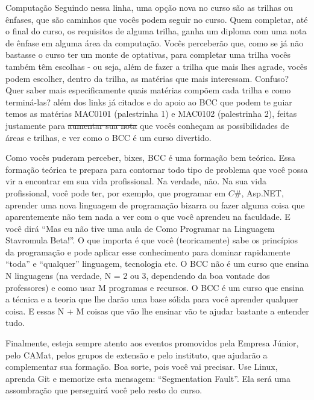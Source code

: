\begin{subsecao}{Computação}
Seguindo nessa linha, uma opção nova no curso são as trilhas ou ênfases, que
são caminhos que vocês podem seguir no curso. Quem completar, até o final
do curso, os requisitos de alguma trilha, ganha um diploma com uma nota de
ênfase em alguma área da computação. Vocês perceberão que, como se já não bastasse o curso ter
um monte de optativas, para completar uma trilha vocês também têm escolhas - ou seja,
além de fazer a trilha que mais lhes agrade, vocês podem escolher, dentro da trilha, as matérias
que mais interessam. Confuso? Quer saber mais especificamente quais matérias compõem cada trilha
e como terminá-las? além dos links já citados e do apoio ao BCC que podem te guiar temos 
as matérias MAC0101 (palestrinha 1) e MAC0102 (palestrinha 2), 
feitas justamente para \sout{aumentar sua nota} que vocês conheçam as 
possibilidades de áreas e trilhas, e ver como o BCC é um curso divertido.

Como vocês puderam perceber, bixes, BCC é uma formação bem teórica. Essa
formação teórica te prepara para contornar todo tipo de problema que você
possa vir a encontrar em sua vida profissional. Na verdade, não. Na sua vida
profissional, você pode ter, por exemplo, que programar em $C\#$, Asp.NET,
aprender uma nova linguagem de programação bizarra ou fazer alguma coisa que
aparentemente não tem nada a ver com o que você aprendeu na faculdade. E você
dirá ``Mas eu não tive uma aula de Como Programar na Linguagem Stavromula
Beta!''. O que importa é que você (teoricamente) sabe os princípios da
programação e pode aplicar esse conhecimento para dominar rapidamente ``toda'' e
``qualquer'' linguagem, tecnologia etc. O BCC não é um curso que ensina N
linguagens (na verdade, N = 2 ou 3, dependendo da boa vontade dos professores) e
como usar M programas e recursos. O BCC é um curso que ensina a técnica e a
teoria que lhe darão uma base sólida para você aprender qualquer coisa. E essas N
+ M coisas que vão lhe ensinar vão te ajudar bastante a entender tudo.

Finalmente, esteja sempre atento aos eventos promovidos pela Empresa Júnior,
pelo CAMat, pelos grupos de extensão e pelo instituto, que ajudarão a
complementar sua formação. Boa sorte, pois você vai precisar. Use Linux, aprenda
Git e memorize esta mensagem: ``Segmentation Fault''. Ela será uma assombração
que perseguirá você pelo resto do curso.

\end{subsecao}
